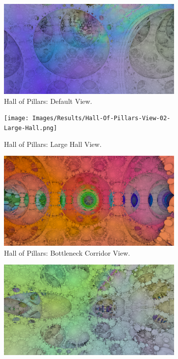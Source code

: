 \begin{figure}[ht]
	\centering

	\begin{subfigure}[c]{0.3\linewidth}
		\includegraphics[width=\linewidth, frame]{Images/Results/Hall-Of-Pillars-View-01-Default.png}
		\caption{Hall of Pillars: Default View.}
		\label{figure:hall-of-pillars-view-01-default}
	\end{subfigure}
	\hfill
	\begin{subfigure}[c]{0.3\linewidth}
		\texttt{[image: Images/Results/Hall-Of-Pillars-View-02-Large-Hall.png]}
		\caption{Hall of Pillars: Large Hall View.}
		\label{figure:hall-of-pillars-view-02-large-hall}
	\end{subfigure}
	\hfill
	\begin{subfigure}[c]{0.3\linewidth}
		\includegraphics[width=\linewidth, frame]{Images/Results/Hall-Of-Pillars-View-03-Corridor-Of-Bottlenecks.png}
		\caption{Hall of Pillars: Bottleneck Corridor View.}
		\label{figure:hall-of-pillars-view-03-bottleneck-corridor}
	\end{subfigure}
	\hfill
	\begin{subfigure}[c]{0.3\linewidth}
		\includegraphics[width=\linewidth, frame]{Images/Results/Hall-Of-Pillars-View-04-Intricate-Geometry.png}

\end{subfigure}
\end{figure}
